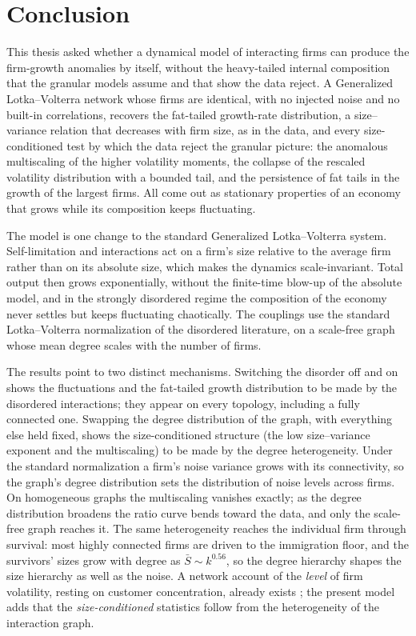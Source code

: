\chapter{Conclusion}
\label{chap:conclusion}

This thesis asked whether a dynamical model of interacting firms can produce the
firm-growth anomalies by itself, without the heavy-tailed internal composition that the
granular models assume and that \citet{moran2024} show the data reject. A Generalized
Lotka--Volterra network whose firms are identical, with no injected
noise and no built-in correlations, recovers the fat-tailed growth-rate distribution, a
size--variance relation that decreases with firm size, as in the data, and every size-conditioned
test by which the data reject the granular picture: the anomalous multiscaling of the
higher volatility moments, the collapse of the rescaled volatility distribution with a
bounded tail, and the persistence of fat tails in the growth of the largest firms. All
come out as stationary properties of an economy that grows while its composition keeps
fluctuating.

The model is one change to the standard Generalized Lotka--Volterra system.
Self-limitation and interactions act on a firm's size relative to the average firm rather
than on its absolute size, which makes the dynamics scale-invariant. Total output then grows
exponentially, without the finite-time blow-up of the absolute model, and in the strongly
disordered regime the composition of the economy never settles but keeps fluctuating
chaotically. The couplings use the standard Lotka--Volterra normalization of the disordered
literature, on a scale-free graph whose mean degree scales with the
number of firms.

The results point to two distinct mechanisms.
Switching the disorder off and on shows the fluctuations and the fat-tailed growth
distribution to be made by the disordered interactions; they appear on every topology,
including a fully connected one. Swapping the degree distribution of the graph, with
everything else held fixed, shows the size-conditioned structure (the low
size--variance exponent and the multiscaling) to be made by the degree heterogeneity.
Under the standard normalization a firm's noise variance grows with its connectivity, so
the graph's degree distribution sets the distribution of noise levels across firms. On
homogeneous graphs the multiscaling vanishes exactly; as the degree distribution
broadens the ratio curve bends toward the data, and only the scale-free graph reaches
it. The same heterogeneity reaches the individual firm through survival: most highly
connected firms are driven to the immigration floor, and the survivors'
sizes grow with degree as $\bar S \sim k^{0.56}$, so the degree hierarchy shapes
the size hierarchy as well as the noise.
A network account of the \emph{level} of firm volatility, resting on customer
concentration, already exists \citep{herskovic2020}; the present model adds that the
\emph{size-conditioned} statistics follow from the heterogeneity of the interaction
graph.

